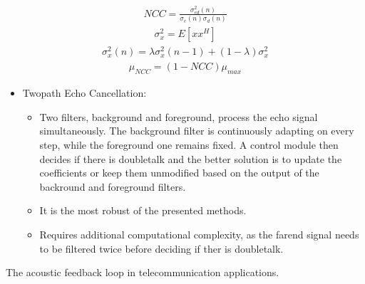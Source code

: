 \documentclass[letterpaper,10pt,english]{jupyterBook}
\begin{document}
\begin{equation*}
\begin{split} NCC = \frac{\sigma^{2}_{ed}(n)}{\sigma_{e}(n)\sigma_{d}(n)}
\end{split}
\end{equation*}\begin{equation*}
\begin{split} \sigma^{2}_{x} = E[xx^H] \end{split}
\end{equation*}\begin{equation*}
\begin{split} \sigma^{2}_{x}(n) =
\lambda\sigma^{2}_{x}(n - 1) + (1 - \lambda)\sigma^{2}_{x} \end{split}
\end{equation*}\begin{equation*}
\begin{split} \mu_{NCC} = (1 - NCC)\mu_{max} \end{split}
\end{equation*}\begin{itemize}
\item {} 
\sphinxAtStartPar
Two\sphinxhyphen{}path Echo Cancellation:
\begin{itemize}
\item {} 
\sphinxAtStartPar
Two filters, background and foreground, process the echo signal
simultaneously. The background filter is continuously adapting
on every step, while the foreground one remains fixed. A control
module then decides if there is double\sphinxhyphen{}talk and the better
solution is to update the coefficients or keep them unmodified
based on the output of the backround and foreground filters.

\item {} 
\sphinxAtStartPar
It is the most robust of the presented methods.

\item {} 
\sphinxAtStartPar
Requires additional computational complexity, as the far\sphinxhyphen{}end
signal needs to be filtered twice before deciding if ther is
double\sphinxhyphen{}talk.

\end{itemize}

\end{itemize}

\sphinxAtStartPar
The acoustic feedback loop in telecommunication applications.

\sphinxAtStartPar
{}
\end{document}
